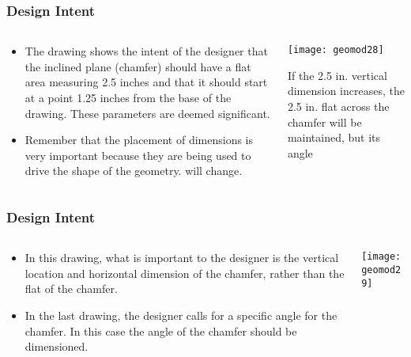\begin{frame}[fragile]\frametitle{Design Intent}
 \begin{columns}
  \begin{column}{0.55\linewidth}

\begin{itemize}
\item The drawing shows the intent of the designer that the inclined plane (chamfer) should have a flat area measuring 2.5 inches and that it should start at a point 1.25 inches from the base of the drawing. These parameters are deemed significant.
\item Remember that the placement of dimensions is very important because they are being used to drive the shape of the geometry. will change.
\end{itemize}
  \end{column}%
  \begin{column}{0.45\linewidth}
			\begin{center}
	\texttt{[image: geomod28]}
			\end{center}
			
			If the 2.5 in. vertical dimension increases, the 2.5 in. flat across the chamfer will be maintained, but its angle 
  \end{column}
 \end{columns}			
\end{frame}

\begin{frame}[fragile]\frametitle{Design Intent}
 \begin{columns}
  \begin{column}{0.55\linewidth}

\begin{itemize}
\item In this drawing, what is important to the designer is the vertical location and horizontal dimension of the chamfer, rather than the flat of the chamfer. 
\item In the last drawing, the designer calls for a specific angle for the chamfer. In this case the angle of the chamfer should be dimensioned.
\end{itemize}
	
  \end{column}%
  \begin{column}{0.45\linewidth}
			\begin{center}
	\texttt{[image: geomod29]}
			\end{center}
  \end{column}
 \end{columns}
\end{frame}

